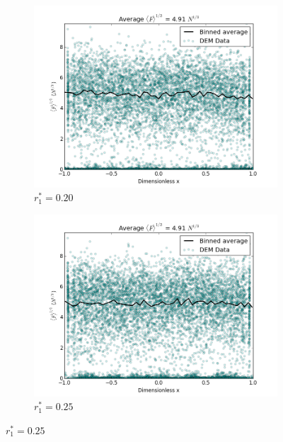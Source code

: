 \begin{figure}[!ht]
	\centering
	\begin{subfigure}[b]{\doubleimagewidth}
		\centering
		\includegraphics[width=\textwidth]{chapters/figures/crush-fragments/force-scatter-20.png}
		\caption{$r_1^* = 0.20$}\label{fig:fragment-contact-forces-20}
	\end{subfigure}
	\begin{subfigure}[b]{\doubleimagewidth}
		\centering
		\includegraphics[width=\textwidth]{chapters/figures/crush-fragments/force-scatter-25.png}
		\caption{$r_1^* = 0.25$}\label{fig:fragment-contact-forces-25}
	\end{subfigure}


\end{figure}
